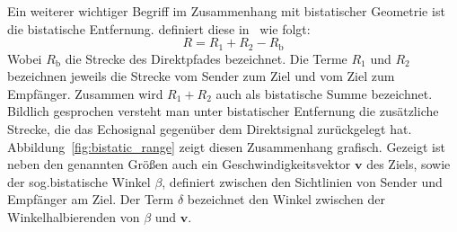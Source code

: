 Ein weiterer wichtiger Begriff im Zusammenhang mit bistatischer Geometrie ist die bistatische Entfernung. \citeauthor{Malanowski2019} definiert diese in~\cite[S.~10]{Malanowski2019} wie folgt:%
%
\begin{equation}
    R = R_1 + R_2 - R_\text{b}
\end{equation}\label{eq:bistatic_range}%
%
Wobei \(R_\text{b}\) die Strecke des Direktpfades bezeichnet. Die Terme \(R_1\) und \(R_2\) bezeichnen jeweils die Strecke vom Sender zum Ziel und vom Ziel zum Empfänger. Zusammen wird \(R_1 + R_2\) auch als bistatische Summe bezeichnet. Bildlich gesprochen versteht man unter bistatischer Entfernung die zusätzliche Strecke, die das Echosignal gegenüber dem Direktsignal zurückgelegt hat. Abbildung~\ref{fig:bistatic_range} zeigt diesen Zusammenhang grafisch. Gezeigt ist neben den genannten Größen auch ein Geschwindigkeitsvektor \(\boldsymbol{v}\) des Ziels, sowie der sog.\@ bistatische Winkel \(\beta \), definiert zwischen den Sichtlinien von Sender und Empfänger am Ziel. Der Term \(\delta \) bezeichnet den Winkel zwischen der Winkelhalbierenden von \(\beta \) und \(\boldsymbol{v}\).

